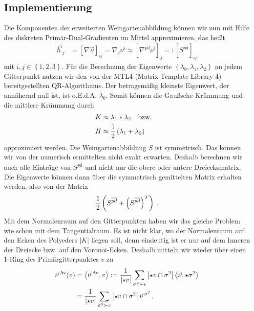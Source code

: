   \subsection{Implementierung}
    Die Komponenten der erweiterten Weingartenabbildung können wir nun mit Hilfe des diskreten Primär-Dual-Gradienten im Mittel approximieren, das heißt
    \begin{align}
      \bar{h}^{i}_{\phantom{i}j} &= \left[ \nabla\vec{\nu} \right]_{ij} = \nabla_{j}\nu^{i}
                                 \approx \left[ \nabla^{\overline{pd}}\nu^{i} \right]_{j}
                                 =: \left[ S^{\overline{pd}} \right]_{ij}
    \end{align}
    mit \( i,j \in \left\{ 1,2,3 \right\} \).
    Für die Berechnung der Eigenwerte \( \left\{ \lambda_{0}, \lambda_{1}, \lambda_{2} \right\} \) an jedem Gitterpunkt 
    nutzen wir den von der MTL4 (Matrix Template Library 4) bereitgestellten QR-Algorithmus.
    Der betragsmäßig kleinste Eigenwert, der annähernd null ist, ist o.E.d.A. \( \lambda_{0} \).
    Somit können die Gaußsche Krümmung und die mittlere Krümmung durch
    \begin{align}
      K &\approx \lambda_{1}*\lambda_{2} \quad\text{bzw.}\quad \\
      H &\approx \frac{1}{2}\left( \lambda_{1}+\lambda_{2}\right)    
    \end{align}
    approximiert werden.
    Die Weingartenabbildung \( S \) ist symmetrisch. 
    Das können wir von der numerisch ermittelten nicht exakt erwarten.
    Deshalb berechnen wir auch alle Einträge von \( S^{\overline{pd}} \) und nicht nur die obere oder
    untere Dreiecksmatrix. 
    Die Eigenwerte können dann über die symmetrisch gemittelten Matrix erhalten werden, also von der Matrix
    \begin{align}
      \frac{1}{2} \left( S^{\overline{pd}} + \left( S^{\overline{pd}} \right)^{T} \right) \,\text{.}
    \end{align}
    Mit dem Normalenraum auf den Gitterpunkten haben wir das gleiche Problem wie schon mit dem Tangentialraum.
    Es ist nicht klar, wo der Normalenraum auf den Ecken des Polyeders \( |K| \) liegen soll, denn eindeutig ist er nur auf dem Inneren der Dreiecke
    bzw. auf den Voronoi-Ecken.
    Deshalb mitteln wir wieder über einen 1-Ring des Primärgitterpunktes \( v \) zu
    \begin{align}
    \label{eqNormalMittel}
    \begin{aligned}
      \vec{\nu}^{\,\text{Av}}(v) &= \left\langle \vec{\nu}^{\,\text{Av}}, v \right\rangle 
          := \frac{1}{\left| \star v \right|} \sum_{\sigma^{2}\succ v} \left| \star v \cap \sigma^{2}\right| 
                      \left\langle \vec{\nu}, \star\sigma^{2} \right\rangle \\
          &= \frac{1}{\left| \star v \right|} \sum_{\sigma^{2}\succ v} \left| \star v \cap \sigma^{2}\right| 
                                          \vec{\nu}^{\,\sigma^{2}} \,\text{.}
    \end{aligned}
    \end{align}
